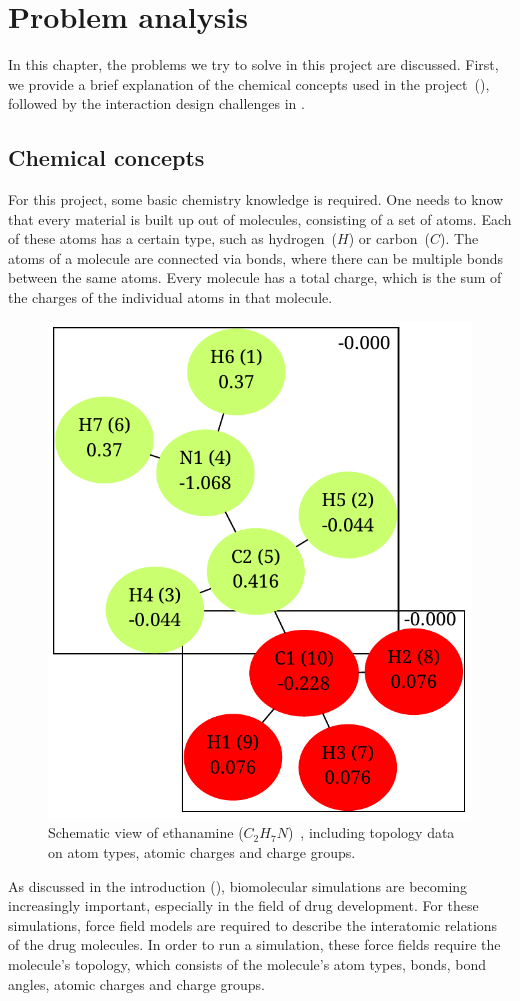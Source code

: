 \chapter{Problem analysis}

In this chapter, the problems we try to solve in this project are discussed. First, we provide a brief explanation of the chemical concepts used in the project~(), followed by the interaction design challenges in .

\section{Chemical concepts}
For this project, some basic chemistry knowledge is required. One needs to know that every material is built up out of molecules, consisting of a set of atoms. Each of these atoms has a certain type, such as hydrogen~($H$) or carbon~($C$). The atoms of a molecule are connected via bonds, where there can be multiple bonds between the same atoms. Every molecule has a total charge, which is the sum of the charges of the individual atoms in that molecule.

\begin{figure}
\vspace{-2em}
\begin{center}
\includegraphics[width=.38\textwidth]{img/ethanamine.pdf}
\caption{Schematic view of ethanamine ($C_{2}H_{7}N$)~\cite{atb2014ethanamine}, including topology data on atom types, atomic charges and charge groups.}
\end{center}
\vspace{-2em}
\end{figure}

As discussed in the introduction (), biomolecular simulations are becoming increasingly important, especially in the field of drug development. For these simulations, force field models are required to describe the interatomic relations of the drug molecules. In order to run a simulation, these force fields require the molecule's topology, which consists of the molecule's atom types, bonds, bond angles, atomic charges and charge groups.


